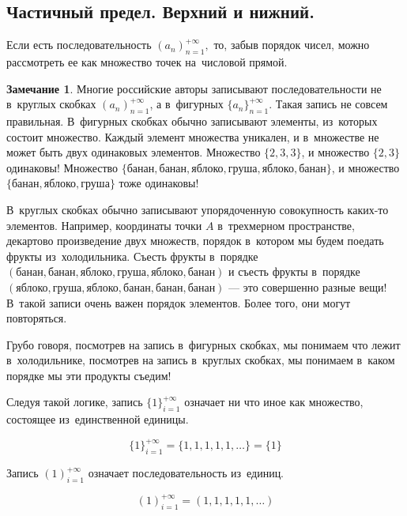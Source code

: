 \documentclass[pdftex, 12pt, a4paper]{article}
\theoremstyle{definition} %
\newtheorem*{rem}{Замечание}
\numberwithin{problem}{section}
\numberwithin{blits}{section}
\begin{document}
\subsection{Частичный предел. Верхний и нижний.}

Если есть последовательность $ (a_{n} )_{n=1}^{+ \infty},$ то, забыв порядок чисел, можно рассмотреть ее как множество точек на~числовой прямой.

\begin{rem}
Многие российские авторы записывают последовательности не в~круглых скобках $(a_{n} )_{n=1}^{+ \infty}$, а в~фигурных $\{a_{n} \}_{n=1}^{+ \infty}$. Такая запись не совсем правильная. В~фигурных скобках обычно записывают элементы, из~которых состоит множество. Каждый элемент множества уникален, и в~множестве не может быть двух одинаковых элементов. Множество $\{ 2,3,3 \}$, и множество $\{2,3\}$ одинаковы! Множество $\{\text{банан},\text{банан},\text{яблоко},\text{груша}, \text{яблоко},\text{банан}\}$, и множество $\{\text{банан},\text{яблоко},\text{груша} \}$ тоже одинаковы!

В~круглых скобках обычно записывают упорядоченную совокупность каких-то элементов. Например, координаты точки $A$ в~трехмерном пространстве, декартово произведение двух множеств, порядок в~котором мы будем поедать фрукты из~холодильника. Съесть фрукты в~порядке $(\text{банан},\text{банан},\text{яблоко},\text{груша}, \text{яблоко},\text{банан})$ и съесть фрукты в~порядке $(\text{яблоко},\text{груша},\text{яблоко},\text{банан},\text{банан},\text{банан})$ --- это совершенно разные вещи! В~такой записи очень важен порядок элементов. Более того, они могут повторяться.

Грубо говоря, посмотрев на запись в~фигурных скобках, мы понимаем что лежит в~холодильнике, посмотрев на запись в~круглых скобках, мы понимаем в~каком порядке мы эти продукты съедим!

Следуя такой логике, запись $\{1\}_{i=1}^{+\infty}$ означает ни что иное как множество, состоящее из~единственной единицы.

\[\{1\}_{i=1}^{+\infty} = \{1,1,1,1,1, \dots \} = \{1 \} \]

Запись $(1)_{i=1}^{+\infty}$ означает последовательность из~единиц.

\[(1)_{i=1}^{+\infty} = (1,1,1,1,1, \dots )\]

\end{rem}
\end{document}
